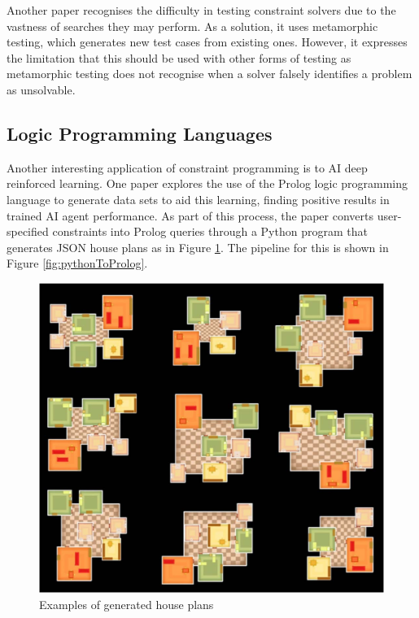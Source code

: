 Another paper \cite{Metamorphic_Testing} recognises the difficulty in testing constraint solvers due to the vastness of searches they may perform. As a solution, it uses metamorphic testing, which generates new test cases from existing ones. However, it expresses the limitation that this should be used with other forms of testing as metamorphic testing does not recognise when a solver falsely identifies a problem as unsolvable.

\subsection{Logic Programming Languages}
Another interesting application of constraint programming is to AI deep reinforced learning. One paper \cite{Prolog_Deep_Learning} explores the use of the Prolog logic programming language to generate data sets to aid this learning, finding positive results in trained AI agent performance. As part of this process, the paper converts user-specified constraints into Prolog queries through a Python program that generates JSON house plans as in Figure \ref{fig:housePlans}. The pipeline for this is shown in Figure \ref{fig:pythonToProlog}.

\begin{figure}[H]
    \centering
    \includegraphics[width=\textwidth, height=0.3\textheight, keepaspectratio]{Images/HousePlans.jpg}
    \caption{Examples of generated house plans \cite{Prolog_Deep_Learning}}
    \label{fig:housePlans}
\end{figure}

